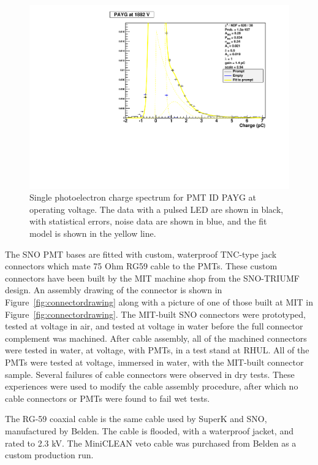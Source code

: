 \documentclass{JINST}
\begin{document}
\begin{figure}[ht]
\begin{center}
\includegraphics[width=4.5in]{graphics/PAYG_singlePE.pdf}
\caption{Single photoelectron charge spectrum for PMT ID PAYG at operating voltage.  The data with a pulsed LED are shown in black, with statistical errors, noise data are shown in blue, and the fit model is shown in the yellow line.
\label{fig:pmt_spe_q}}
\end{center}
\end{figure}

The SNO PMT bases are fitted with custom, waterproof TNC-type jack
connectors which mate 75 Ohm RG59 cable to the PMTs.  These custom
connectors have been built by the MIT machine shop from the SNO-TRIUMF
design. An assembly drawing of the connector is shown in
Figure~\ref{fig:connectordrawing} along with a picture of one of those
built at MIT in Figure~\ref{fig:connectordrawing}. The MIT-built SNO
connectors were prototyped, tested at voltage in air, and tested at
voltage in water before the full connector complement was machined.
After cable assembly, all of the machined connectors were tested in
water, at voltage, with PMTs, in a test stand at RHUL.  All of the
PMTs were tested at voltage, immersed in water, with the MIT-built connector
sample.  Several failures of cable connectors were observed in dry
tests.  These experiences were used to modify the cable assembly
procedure, after which no cable connectors or PMTs were found to fail
wet tests.


The RG-59 coaxial cable is the same cable used by SuperK and SNO,
manufactured by Belden.  The cable is flooded, with a waterproof
jacket, and rated to 2.3 kV.  The MiniCLEAN veto cable was purchased
from Belden as a custom production run.  
\end{document}
